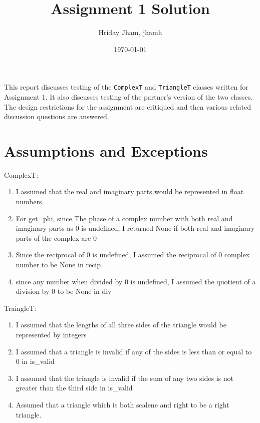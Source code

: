 \documentclass[12pt]{article}
\title{Assignment 1 Solution}
\author{Hriday Jham, jhamh}
\date{\today}
\begin{document}
\maketitle

This report discusses testing of the \verb|ComplexT| and \verb|TriangleT|
classes written for Assignment 1. It also discusses testing of the partner's
version of the two classes. The design restrictions for the assignment
are critiqued and then various related discussion questions are answered.

\section{Assumptions and Exceptions} \label{AssumptAndExcept}
ComplexT:

\begin{enumerate}

\item I assumed that the real and imaginary parts would be represented in float numbers.  

\item For get\_phi, since The phase of a complex number with both real and imaginary parts as 0 is undefined, I returned None if both real and imaginary parts of the complex are 0

\item Since the reciprocal of 0 is undefined, I assumed the reciprocal of 0 complex number to be None in recip

\item since any number when divided by 0 is undefined, I assumed the quotient of a division by 0 to be None in div

\end{enumerate}

\noindent TraingleT:

\begin{enumerate}

\item I assumed that the lengths of all three sides of the triangle would be represented by integers

\item I assumed that a triangle is invalid if any of the sides is less than or equal to 0 in is\_valid

\item I assumed that the triangle is invalid if the sum of any two sides is not greater than the third side in is\_valid

\item Assumed that a triangle which is both scalene and right to be a right triangle.

\end{enumerate}
\end{document}
